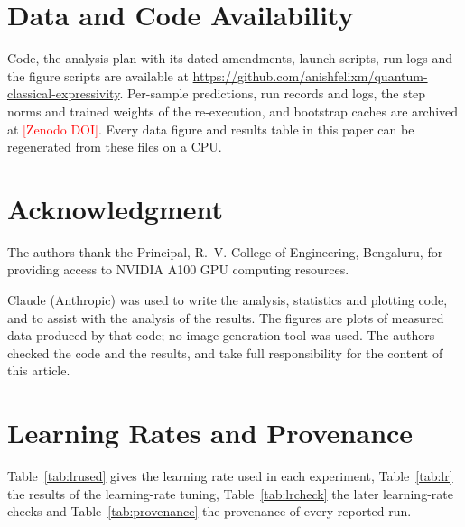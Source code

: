 \documentclass{ieeeaccess}
\newcommand{\pending}[1]{\textcolor{red}{#1}}
\begin{document}
\section*{Data and Code Availability}
Code, the analysis plan with its dated amendments, launch scripts, run logs and the figure scripts are available at \url{https://github.com/anishfelixm/quantum-classical-expressivity}. Per-sample predictions, run records and logs, the step norms and trained weights of the re-execution, and bootstrap caches are archived at \pending{[Zenodo DOI]}. Every data figure and results table in this paper can be regenerated from these files on a CPU.

\section*{Acknowledgment}
The authors thank the Principal, R.~V. College of Engineering, Bengaluru, for providing access to NVIDIA A100 GPU computing resources.

Claude (Anthropic) was used to write the analysis, statistics and plotting code, and to assist with the analysis of the results. The figures are plots of measured data produced by that code; no image-generation tool was used. The authors checked the code and the results, and take full responsibility for the content of this article.

\appendices
\section{Learning Rates and Provenance}
\label{app:tables}
Table~\ref{tab:lrused} gives the learning rate used in each experiment, Table~\ref{tab:lr} the results of the learning-rate tuning, Table~\ref{tab:lrcheck} the later learning-rate checks and Table~\ref{tab:provenance} the provenance of every reported run.
\end{document}
